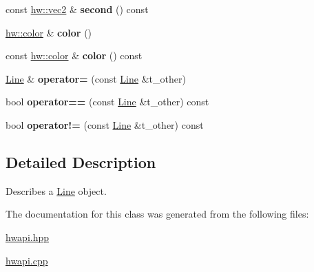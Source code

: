 \begin{DoxyCompactItemize}
\item 
\mbox{\label{classdummy__api_1_1Line_a5ef35b0438af5d8f0288f79be06f2990}} 
const \mbox{\hyperlink{structhw_1_1vec2}{hw\+::vec2}} \& {\bfseries second} () const
\item 
\mbox{\label{classdummy__api_1_1Line_ac5b4cc17587cb5d7e04c6e04571a3e62}} 
\mbox{\hyperlink{structhw_1_1color}{hw\+::color}} \& {\bfseries color} ()
\item 
\mbox{\label{classdummy__api_1_1Line_aea744d25b44940d3ff157b909db6f3e9}} 
const \mbox{\hyperlink{structhw_1_1color}{hw\+::color}} \& {\bfseries color} () const
\item 
\mbox{\label{classdummy__api_1_1Line_a58d38792967543384187a0fc9d3b8e7e}} 
\mbox{\hyperlink{classdummy__api_1_1Line}{Line}} \& {\bfseries operator=} (const \mbox{\hyperlink{classdummy__api_1_1Line}{Line}} \&t\+\_\+other)
\item 
\mbox{\label{classdummy__api_1_1Line_a173e59d1f9b51297de56ce9fab8f6e4e}} 
bool {\bfseries operator==} (const \mbox{\hyperlink{classdummy__api_1_1Line}{Line}} \&t\+\_\+other) const
\item 
\mbox{\label{classdummy__api_1_1Line_af5396168bfe49ec0451670c739480dcf}} 
bool {\bfseries operator!=} (const \mbox{\hyperlink{classdummy__api_1_1Line}{Line}} \&t\+\_\+other) const
\end{DoxyCompactItemize}


\subsection{Detailed Description}
Describes a \mbox{\hyperlink{classdummy__api_1_1Line}{Line}} object. 

The documentation for this class was generated from the following files\+:\begin{DoxyCompactItemize}
\item 
\mbox{\hyperlink{hwapi_8hpp}{hwapi.\+hpp}}\item 
\mbox{\hyperlink{hwapi_8cpp}{hwapi.\+cpp}}\end{DoxyCompactItemize}
